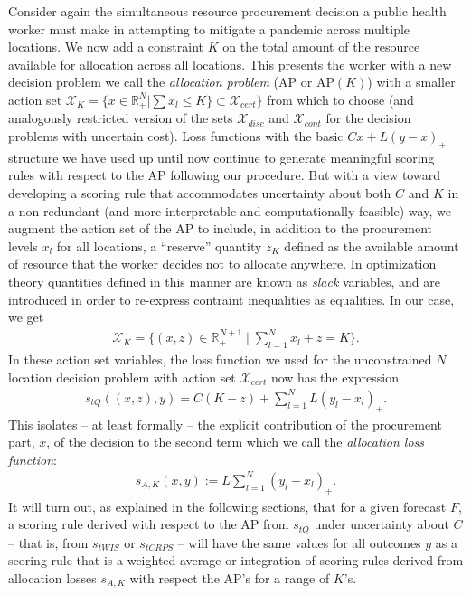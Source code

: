 \documentclass{article}
\begin{document}
Consider again the simultaneous resource procurement decision a public health worker must make in attempting to mitigate a pandemic across multiple locations. 
We now add a constraint $K$ on the total amount of the resource available for allocation across all locations. This presents the worker with a new decision problem we call the \emph{allocation problem} (AP or $\mathrm{AP}(K)$) with a smaller action set $\mathcal{X}_K = \{x \in \mathbb{R}_{+}^N | \sum x_l \leq K\} \subset \mathcal{X}_{cert}\}$ from which to choose (and analogously restricted version of the sets $\mathcal{X}_{disc}$ and $\mathcal{X}_{cont}$ for the decision problems with uncertain cost). Loss functions with the basic $Cx + L(y-x)_{+}$ structure we have used up until now continue to generate meaningful scoring rules with respect to the AP following our procedure.  But with a view toward developing a scoring rule that accommodates uncertainty about both $C$ and $K$ in a non-redundant (and more interpretable and computationally feasible) way, we augment the action set of the AP to include, in addition to the procurement levels $x_l$ for all locations, a ``reserve'' quantity $z_K$ defined as the available amount of resource that the worker decides not to allocate anywhere.
In optimization theory quantities defined in this manner are known as \emph{slack} variables, and are introduced in order to re-express contraint inequalities as equalities.  In our case, we get
\begin{align}
\mathcal{X}_{K} = \{(x,z) \in \mathbb{R}_{+}^{N+1} \mid \sum_{l=1}^{N}x_l + z = K \}.
\end{align}
In these action set variables, the loss function we used for the unconstrained $N$ location decision problem with action set $\mathcal{X}_{cert}$ now has the expression
\begin{align}
s_{tQ}\left((x,z), y\right) = C(K-z) + \sum_{l=1}^{N} L(y_l - x_l)_{+}.
\end{align}
This isolates -- at least formally -- the explicit contribution of the procurement part, $x$, of the decision to the second term which we call the \emph{allocation loss function}:
\begin{align}
s_{A,K}(x,y):= L\sum_{l=1}^{N} (y_l - x_l)_{+}.
\end{align}
It will turn out, as explained in the following sections, that for a given forecast $F$, a scoring rule derived with respect to the AP from $s_{tQ}$ under uncertainty about $C$ -- that is, from $s_{tWIS}$ or $s_{tCRPS}$ -- will have the same values for all outcomes $y$ as a scoring rule that is a weighted average or integration of scoring rules derived from allocation losses $s_{A,K}$ with respect the AP's for a range of $K$'s.
\end{document}
